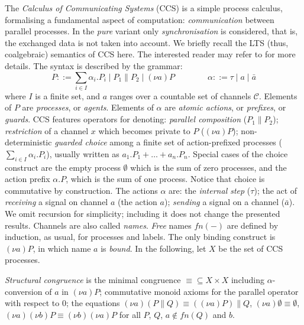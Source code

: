 \documentclass[orivec]{llncs}
\newcommand{\fn}{\mathit{fn}}
\newcommand{\chan}{\mathcal{C}}
\newcommand{\defend}{}
\renewenvironment{definition}{\begin{defn}}{\defend\end{defn}}
\begin{document}
The \emph{Calculus of Communicating Systems} (CCS) is a simple process calculus, formalising a fundamental aspect of computation: \emph{communication} between parallel processes. In the \emph{pure} variant only \emph{synchronisation} is considered, that is, the exchanged data is not taken into account.
We briefly recall the LTS (thus, coalgebraic) semantics of CCS here. The interested reader may refer to \cite{Mil82} for more details.
The syntax is described by the grammar: 
$$ P ::= \sum_{i \in I} \alpha_i . P_i \mid P_1 \parallel P_2 \mid (\nu a) P \qquad \qquad \alpha ::= \tau \mid a \mid \bar a$$
where $I$ is a finite set, and $a$ ranges over a countable set of channels $\chan$. Elements of $P$ are \emph{processes}, or \emph{agents}. Elements of $\alpha$ are \emph{atomic actions}, or \emph{prefixes}, or \emph{guards}.  CCS features operators for denoting: \emph{parallel composition} ($P_1 \parallel P_2$); \emph{restriction} of a channel $x$ which becomes private to $P$ ($(\nu a) P$);  non-deterministic \emph{guarded choice} among a finite set of action-prefixed processes ($\sum_{i \in I} \alpha_i . P_i$), usually written as $a_1 . P_1 + \ldots + a_n . P_n$. Special cases of the choice construct are the empty process $\emptyset$ which is the sum of zero processes, and the action prefix $\alpha. P$, which is the sum of one process. Notice that choice is commutative by construction. The actions $\alpha$ are: the \emph{internal step} ($\tau$); the act of \emph{receiving} a signal on channel $a$ (the action $a$); \emph{sending} a signal on a channel ($\bar a$). We omit recursion for simplicity; including it does not change the presented results.
Channels are also called \emph{names}. \emph{Free} names $\fn(-)$ are defined by induction, as usual, for processes and labels. The only binding construct is $(\nu a)P$, in which name $a$ is \emph{bound}.
In the following, let $X$ be the set of CCS processes. 

\begin{definition}\label{def:structural-congruence}
\emph{Structural congruence} is the minimal congruence $\equiv \subseteq X \times X$ including $\alpha$-conversion of $a$ in $(\nu a) P$; commutative monoid axioms for the parallel operator with respect to $0$; the equations $(\nu a) (P \parallel Q) \equiv ((\nu a) P) \parallel Q$, $(\nu a) \emptyset \equiv \emptyset$, $(\nu a)(\nu b) P \equiv (\nu b) (\nu a) P$ for all $P$, $Q$, $a\notin \fn(Q)$ and $b$. 
\end{definition}
\end{document}
